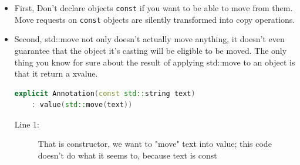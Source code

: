 \documentclass[a4paper,11pt,twoside]{book}
\begin{document}
\begin{itemize}
%	
%		
%	


\item First, Don't declare objects \texttt{const} if you want to be able to move from them. Move requests on \texttt{const} objects are silently transformed into copy operations.

\item Second, std::move not only doesn't actually move anything, it doesn't even guarantee that the object it's casting will be eligible to be moved. The only thing you know for sure about the result of applying std::move to an object is that it return a xvalue.

\begin{lstlisting}[frame=single, language=c++]
	explicit Annotation(const std::string text)
	: value(std::move(text)) 
\end{lstlisting}
\begin{description}
	\item[Line 1:] That is constructor, we want to "move" text into value; this code doesn't do what it seems to, because text is const
\end{description}

\end{itemize}
\end{document}
